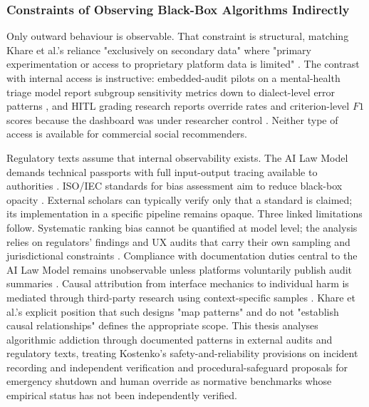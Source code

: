 \documentclass[11pt]{article}
\begin{document}
\subsubsection{Constraints of Observing Black-Box Algorithms Indirectly}
\label{sec:constraints_black_box_observation} Only outward behaviour is observable. That constraint is structural, matching Khare et al.'s reliance "exclusively on secondary data" where "primary experimentation or access to proprietary platform data is limited" \parencites[6]{6295677}. The contrast with internal access is instructive: embedded-audit pilots on a mental-health triage model report subgroup sensitivity metrics down to dialect-level error patterns \parencites[9]{5419804}, and HITL grading research reports override rates and criterion-level $F1$ scores because the dashboard was under researcher control \parencites[17]{6805789}[21]{6805789}. Neither type of access is available for commercial social recommenders.

Regulatory texts assume that internal observability exists. The AI Law Model demands technical passports with full input-output tracing available to authorities \parencites[71]{2977039}. ISO/IEC standards for bias assessment aim to reduce black-box opacity \parencites[2]{8589961}. External scholars can typically verify only that a standard is claimed; its implementation in a specific pipeline remains opaque. Three linked limitations follow. Systematic ranking bias cannot be quantified at model level; the analysis relies on regulators' findings and UX audits that carry their own sampling and jurisdictional constraints \parencites[6]{6295677}[3]{5142478}. Compliance with documentation duties central to the AI Law Model remains unobservable unless platforms voluntarily publish audit summaries \parencites[71]{2977039}[51]{2977039}. Causal attribution from interface mechanics to individual harm is mediated through third-party research using context-specific samples \parencites[9]{5419804}. Khare et al.'s explicit position that such designs "map patterns" and do not "establish causal relationships" \parencites[6]{6295677} defines the appropriate scope. This thesis analyses algorithmic addiction through documented patterns in external audits and regulatory texts, treating Kostenko's safety-and-reliability provisions on incident recording and independent verification \parencites[38]{2977039} and procedural-safeguard proposals for emergency shutdown and human override \parencites[86]{1225951} as normative benchmarks whose empirical status has not been independently verified.
\end{document}
